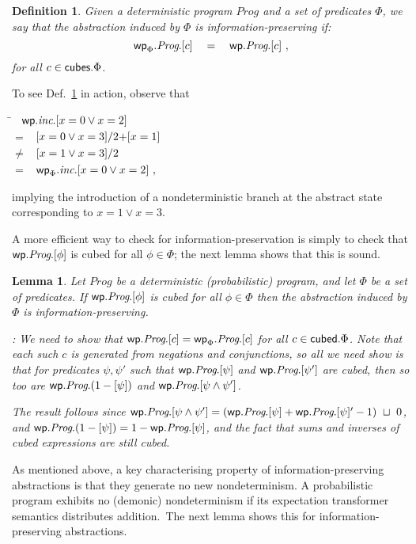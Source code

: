 \documentclass[numbers,copyright,creativecommons]{eptcs}
\newcommand{\cubes}{\mbox{\sf cubes}}
\newcommand{\cubed}{\mbox{\sf cubed}}
\newcommand{\Wp}{\mbox{\sf wp}}
\newcommand{\Max}{~\sqcup~}
\newcommand{\Prog}{\textit{Prog}}
\newcommand{\Wide}[1]{~~~#1~~~}
\newtheorem{Lems}{Lemma} \newcommand{\Lem}[1]{Lem.~\ref{#1}}
\newtheorem{Defns}{Definition}\newtheorem{Corl}{Corollary}\newcommand{\Def}[1]{Def.~\ref{#1}}
\newcommand{\Proof}{\noindent{\bf Proof}: \quad}
\newenvironment{Reason}{\begin{tabbing}\hspace{4em}\=\kill}{\end{tabbing}\vspace{-2.5ex}}
\newcommand{\Step}[2]{#1 \> $\begin{array}[t]{ll}#2\end{array}$ \\}
\begin{document}
\begin{Defns}\label{d0636}
Given a deterministic program $\Prog$ and a set of predicates $\Phi$, we say that the abstraction induced by $\Phi$ is
\emph{information-preserving} if:
\[
\Wp_\Phi.\Prog.[c] \Wide{=} \Wp.\Prog.[c]~,
\]
for all $c\in \cubes.\Phi$.
\end{Defns}

To see \Def{d0636} in action, observe that

\begin{Reason}
\Step{}
{\Wp.\textit{inc}.[x=0 \lor x=2]}
\Step{$ =$}
{ [x=0 \lor x=3]/2 {+} [x=1]}
\Step{$ {\neq}$}
{[x=1 \lor x=3]/2}
\Step{$=$}
{ \Wp_\Phi.\textit{inc}.[x=0 \lor x=2] ~, }
\end{Reason}
implying the introduction of a nondeterministic branch at the abstract state corresponding to $x=1 \lor x=3$.

A more efficient way to check for information-preservation is simply to check that $\Wp.\Prog.[\phi]$ is cubed for all $\phi \in \Phi$; the next lemma shows that this is sound.

\begin{Lems}\label{l1307}
Let $\Prog$ be a deterministic (probabilistic) program, and let $\Phi$ be a set of predicates.
If $\Wp.\Prog.[\phi]$ is cubed for all $\phi \in \Phi$ then the abstraction induced by $\Phi$ is information-preserving.

\Proof
We need to show that $\Wp.\Prog.[c] = \Wp_\Phi.\Prog.[c]$ for all $c \in \cubed.\Phi$. Note that each such $c$ is generated from negations and conjunctions, so all we need show is that for predicates $\psi, \psi'$ such that $\Wp.\Prog.[\psi]$ and $\Wp.\Prog.[\psi']$ are cubed, then so too are $\Wp.\Prog.(1-[\psi])$ and $\Wp.\Prog.[\psi \land \psi']$.

The result follows since $\Wp.\Prog.[\psi \land \psi'] = (\Wp.\Prog.[\psi] + \Wp.\Prog.[\psi]' - 1)\Max 0$, and
$\Wp.\Prog.(1-[\psi]) = 1 - \Wp.\Prog.[\psi]$, and the fact that sums and inverses of cubed expressions are still cubed.
\end{Lems}



As mentioned above, a key characterising property of information-preserving abstractions is that they generate no new nondeterminism.
A probabilistic program exhibits no (demonic) nondeterminism if its expectation transformer semantics distributes addition.\ The next lemma shows this for information-preserving abstractions.
\end{document}
